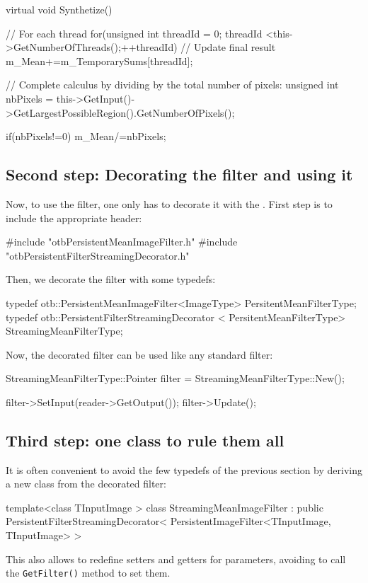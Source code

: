 \begin{cppcode}
virtual void Synthetize()
{
// For each thread
for(unsigned int threadId = 0; threadId <this->GetNumberOfThreads();++threadId)
  {
  // Update final result
  m_Mean+=m_TemporarySums[threadId];
} 

// Complete calculus by dividing by the total number of pixels:
unsigned int nbPixels =
this->GetInput()->GetLargestPossibleRegion().GetNumberOfPixels();

if(nbPixels!=0)
  {
  m_Mean/=nbPixels;
  }  
}
\end{cppcode}

\subsection{Second step: Decorating the filter and using it}

Now, to use the filter, one only has to decorate it with the
. First step is
to include the appropriate header:

\begin{cppcode}
#include "otbPersistentMeanImageFilter.h"
#include "otbPersistentFilterStreamingDecorator.h"
\end{cppcode}

Then, we decorate the filter with some typedefs:

\begin{cppcode}
typedef otb::PersistentMeanImageFilter<ImageType>
  PersitentMeanFilterType;
typedef otb::PersistentFilterStreamingDecorator
  < PersitentMeanFilterType> StreamingMeanFilterType;
\end{cppcode}

Now, the decorated filter can be used like any standard filter:

\begin{cppcode}
StreamingMeanFilterType::Pointer filter =
  StreamingMeanFilterType::New();

filter->SetInput(reader->GetOutput());
filter->Update();
\end{cppcode}

\subsection{Third step: one class to rule them all}

It is often convenient to avoid the few typedefs of the previous
section by deriving a new class from the decorated filter:

\begin{cppcode}
template<class TInputImage >
  class StreamingMeanImageFilter :
    public PersistentFilterStreamingDecorator<
           PersistentImageFilter<TInputImage, TInputImage> >
\end{cppcode}

This also allows to redefine setters and getters for parameters,
avoiding to call the \verb?GetFilter()? method to set them.
